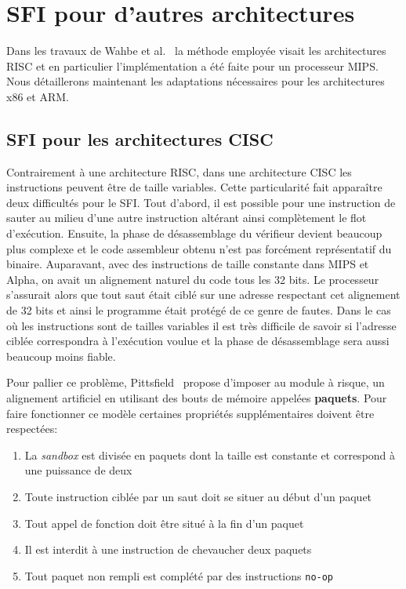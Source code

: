 \documentclass[11pt]{sdm}
\begin{document}
  
\section{SFI pour d'autres architectures}

Dans les travaux de Wahbe et al.~\cite{Wahbe:1993:ESF:173668.168635} la méthode employée visait les architectures RISC et en particulier l'implémentation a été faite pour un processeur MIPS. Nous détaillerons maintenant les adaptations nécessaires pour les architectures x86 et ARM.

\subsection{SFI pour les architectures CISC}
	Contrairement à une architecture RISC, dans une architecture CISC les instructions peuvent être de taille variables. Cette particularité fait apparaître deux difficultés pour le SFI. Tout d'abord, il est possible pour une instruction de sauter au milieu d'une autre instruction altérant ainsi complètement le flot d'exécution. Ensuite, la phase de désassemblage du vérifieur devient beaucoup plus complexe et le code assembleur obtenu n'est pas forcément représentatif du binaire. Auparavant, avec des instructions de taille constante dans MIPS et Alpha, on avait un alignement naturel du code tous les 32 bits. Le processeur s'assurait alors que tout saut était ciblé sur une adresse respectant cet alignement de 32 bits et ainsi le programme était protégé de ce genre de fautes. Dans le cas où les instructions sont de tailles variables il est très difficile de savoir si l'adresse ciblée correspondra à l'exécution voulue et la phase de désassemblage sera aussi beaucoup moins fiable.
	
	Pour pallier ce problème, Pittsfield~\cite{Mccamant_evaluatingsfi} propose d'imposer au module à risque, un alignement artificiel en utilisant des bouts de mémoire appelées \textbf{paquets}.
Pour faire fonctionner ce modèle certaines propriétés supplémentaires doivent être respectées:
\begin{enumerate}
	\item La \textit{sandbox} est divisée en paquets dont la taille est constante et correspond à une puissance de deux
	\item Toute instruction ciblée par un saut doit se situer au début d'un paquet
	\item Tout appel de fonction doit être situé à la fin d'un paquet
	\item Il est interdit à une instruction de chevaucher deux paquets
	\item Tout paquet non rempli est complété par des instructions \texttt{no-op}
\end{enumerate}		
	
\end{document}
